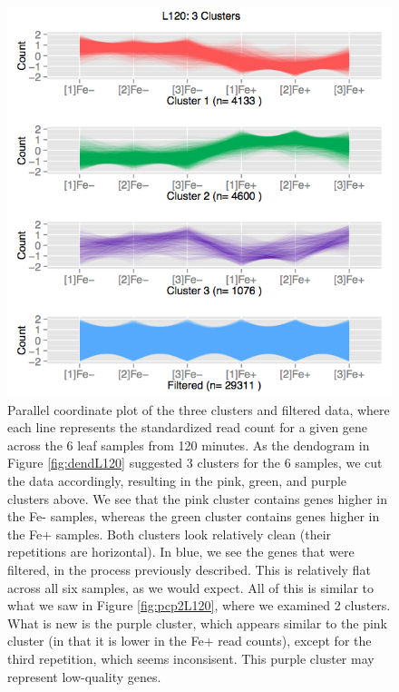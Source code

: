 \documentclass[11pt,a4paper,oldfontcommands,openany]{memoir}
\numberwithin{equation}{section} %
\begin{document}
\begin{figure}[H]
  \begin{framed}
  \centering
  \includegraphics[width=\textwidth]{pcp3L120}
  \end{framed}
  \caption{Parallel coordinate plot of the three clusters and filtered data, where each line represents the standardized read count for a given gene across the 6 leaf samples from 120 minutes. As the dendogram in Figure \ref{fig:dendL120} suggested 3 clusters for the 6 samples, we cut the data accordingly, resulting in the pink, green, and purple clusters above. We see that the pink cluster contains genes higher in the Fe- samples, whereas the green cluster contains genes higher in the Fe+ samples. Both clusters look relatively clean (their repetitions are horizontal). In blue, we see the genes that were filtered, in the process previously described. This is relatively flat across all six samples, as we would expect. All of this is similar to what we saw in Figure \ref{fig:pcp2L120}, where we examined 2 clusters. What is new is the purple cluster, which appears similar to the pink cluster (in that it is lower in the Fe+ read counts), except for the third repetition, which seems inconsisent. This purple cluster may represent low-quality genes.}
  \label{fig:pcp3L120}
\end{figure}
\end{document}

